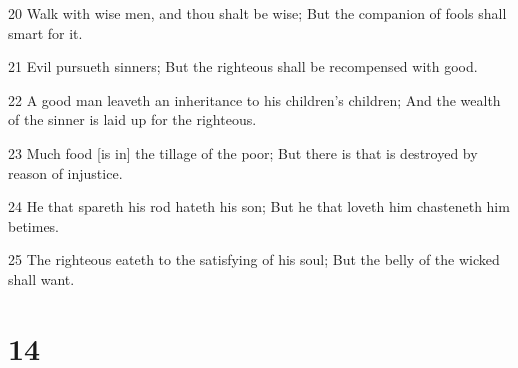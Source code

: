 \par 20 Walk with wise men, and thou shalt be wise; But the companion of fools shall smart for it.
\par 21 Evil pursueth sinners; But the righteous shall be recompensed with good.
\par 22 A good man leaveth an inheritance to his children's children; And the wealth of the sinner is laid up for the righteous.
\par 23 Much food [is in] the tillage of the poor; But there is that is destroyed by reason of injustice.
\par 24 He that spareth his rod hateth his son; But he that loveth him chasteneth him betimes.
\par 25 The righteous eateth to the satisfying of his soul; But the belly of the wicked shall want.

\chapter{14}

